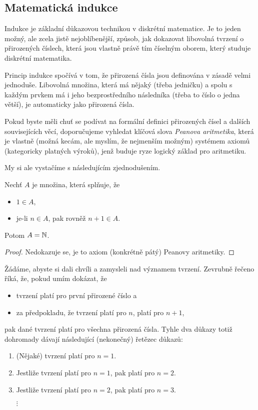 \subsection{Matematická indukce}
\label{ssec:matematicka-indukce}

Indukce je základní důkazovou technikou v diskrétní matematice. Je to jeden
možný, ale zcela jistě nejoblíbenější, způsob, jak dokazovat libovolná tvrzení o
přirozených číslech, která jsou vlastně právě tím číselným oborem, který studuje
diskrétní matematika.

Princip indukce spočívá v tom, že přirozená čísla jsou definována v zásadě velmi
jednoduše. Libovolná množina, která má nějaký  (třeba
jedničku) a spolu s každým prvkem má i jeho bezprostředního následníka (třeba to
číslo o jedna větší), je automaticky  jako přirozená čísla.

Pokud byste měli chuť se podívat na formální definici přirozených čísel a
dalších souvisejících věcí, doporučujeme vyhledat klíčová slova \emph{Peanova
aritmetika}, která je vlastně (možná kecám, ale myslím, že nejmenším možným)
systémem axiomů (kategoricky platných výroků), jenž buduje ryze logický základ
pro aritmetiku.

My si ale vystačíme s následujícím zjednodušením.

\begin{claim}
 Nechť $A$ je množina, která splňuje, že
 \begin{itemize}
  \item $1 \in A$,
  \item je-li $n \in A$, pak rovněž $n+1 \in A$.
 \end{itemize}
 Potom $A = \mathbb{N}$.
\end{claim}
\begin{proof}
 Nedokazuje se, je to axiom (konkrétně pátý) Peanovy aritmetiky.
\end{proof}

Žádáme, abyste si dali chvíli a zamysleli nad významem tvrzení. Zevrubně řečeno
říká, že, pokud umím dokázat, že
\begin{itemize}
 \item tvrzení platí pro první přirozené číslo a
 \item za předpokladu, že tvrzení platí pro $n$, platí pro $n + 1$,
\end{itemize}
pak dané tvrzení platí pro všechna přirozená čísla. Tyhle dva důkazy totiž
dohromady dávají následující (nekonečný) řetězec důkazů:
\begin{enumerate}
 \item (Nějaké) tvrzení platí pro $n = 1$.
 \item Jestliže tvrzení platí pro $n = 1$, pak platí pro $n = 2$.
 \item Jestliže tvrzení platí pro $n = 2$, pak platí pro $n = 3$.

 \centering $\vdots$
\end{enumerate}

